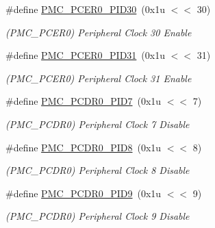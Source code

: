 \begin{DoxyCompactItemize}
\mbox{\label{group__SAMS70__PMC_ga6cf8e6dd627939d699ac9d52591d07b1}} 
\#define \mbox{\hyperlink{group__SAMS70__PMC_ga6cf8e6dd627939d699ac9d52591d07b1}{P\+M\+C\+\_\+\+P\+C\+E\+R0\+\_\+\+P\+I\+D30}}~(0x1u $<$$<$ 30)
\begin{DoxyCompactList}\small\item\em (P\+M\+C\+\_\+\+P\+C\+E\+R0) Peripheral Clock 30 Enable \end{DoxyCompactList}\item 
\mbox{\label{group__SAMS70__PMC_ga6610934096cd9e4f8a23008eaf04cd14}} 
\#define \mbox{\hyperlink{group__SAMS70__PMC_ga6610934096cd9e4f8a23008eaf04cd14}{P\+M\+C\+\_\+\+P\+C\+E\+R0\+\_\+\+P\+I\+D31}}~(0x1u $<$$<$ 31)
\begin{DoxyCompactList}\small\item\em (P\+M\+C\+\_\+\+P\+C\+E\+R0) Peripheral Clock 31 Enable \end{DoxyCompactList}\item 
\mbox{\label{group__SAMS70__PMC_ga007a9be3093ab69525848e66e294a2cb}} 
\#define \mbox{\hyperlink{group__SAMS70__PMC_ga007a9be3093ab69525848e66e294a2cb}{P\+M\+C\+\_\+\+P\+C\+D\+R0\+\_\+\+P\+I\+D7}}~(0x1u $<$$<$ 7)
\begin{DoxyCompactList}\small\item\em (P\+M\+C\+\_\+\+P\+C\+D\+R0) Peripheral Clock 7 Disable \end{DoxyCompactList}\item 
\mbox{\label{group__SAMS70__PMC_gad51b57c4777549ebbfdf58083d35ca51}} 
\#define \mbox{\hyperlink{group__SAMS70__PMC_gad51b57c4777549ebbfdf58083d35ca51}{P\+M\+C\+\_\+\+P\+C\+D\+R0\+\_\+\+P\+I\+D8}}~(0x1u $<$$<$ 8)
\begin{DoxyCompactList}\small\item\em (P\+M\+C\+\_\+\+P\+C\+D\+R0) Peripheral Clock 8 Disable \end{DoxyCompactList}\item 
\mbox{\label{group__SAMS70__PMC_gaee7c6613e881c945c7eaf34adfe2d135}} 
\#define \mbox{\hyperlink{group__SAMS70__PMC_gaee7c6613e881c945c7eaf34adfe2d135}{P\+M\+C\+\_\+\+P\+C\+D\+R0\+\_\+\+P\+I\+D9}}~(0x1u $<$$<$ 9)
\begin{DoxyCompactList}\small\item\em (P\+M\+C\+\_\+\+P\+C\+D\+R0) Peripheral Clock 9 Disable \end{DoxyCompactList}\item 
$$
\end{DoxyCompactItemize}
